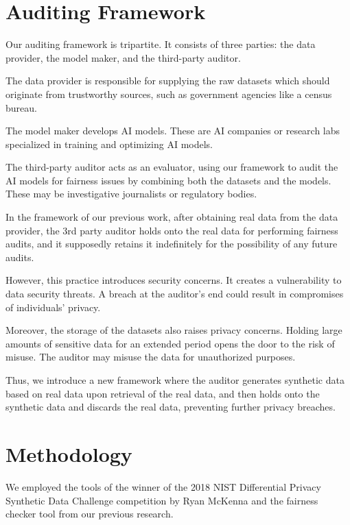 \documentclass[acmsmall,sigconf]{acmart}
\begin{document}
\section{Auditing Framework}

Our auditing framework is tripartite. It consists of three parties: the data provider, the model maker, and the third-party auditor.

The data provider is responsible for supplying the raw datasets which should originate from trustworthy sources, such as government agencies like a census bureau.

The model maker develops AI models. These are AI companies or research labs specialized in training and optimizing AI models.

The third-party auditor acts as an evaluator, using our framework to audit the AI models for fairness issues by combining both the datasets and the models. These may be investigative journalists or regulatory bodies.

In the framework of our previous work\cite{yuan2024ensuring}, after obtaining real data from the data provider, the 3rd party auditor holds onto the real data for performing fairness audits, and it supposedly retains it indefinitely for the possibility of any future audits.

However, this practice introduces security concerns. It creates a vulnerability to data security threats. A breach at the auditor's end could result in compromises of individuals' privacy.

Moreover, the storage of the datasets also raises privacy concerns. Holding large amounts of sensitive data for an extended period opens the door to the risk of misuse. The auditor may misuse the data for unauthorized purposes.

Thus, we introduce a new framework where the auditor generates synthetic data based on real data upon retrieval of the real data, and then holds onto the synthetic data and discards the real data, preventing further privacy breaches.

\section{Methodology}

We employed the tools of the winner of the 2018 NIST Differential Privacy Synthetic Data Challenge competition\cite{NIST2018} by Ryan McKenna\cite{Ullman2022,McKenna2022,McKenna_privatePGM,mckenna2021winning,mckenna2019graphical} and the fairness checker tool from our previous research\cite{yuan2024ensuring}.
\end{document}
